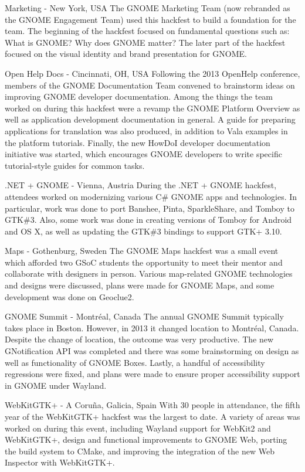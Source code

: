 \documentclass{scrreprt}
\begin{document}
Marketing - New York, USA
The GNOME Marketing Team (now rebranded as the GNOME Engagement Team) used this hackfest to build a foundation for the team.  The beginning of the hackfest focused on  fundamental questions such as: What is GNOME? Why does GNOME matter?  The later part of the hackfest focused on the visual identity and brand presentation for GNOME.

Open Help Docs - Cincinnati, OH, USA
Following the 2013 OpenHelp conference, members of the GNOME Documentation Team convened to brainstorm ideas on improving GNOME developer documentation. Among the things the team worked on during this hackfest were a revamp the GNOME Platform Overview as well as application development documentation in general. A guide for preparing applications for translation was also produced, in addition to Vala examples in the platform tutorials. Finally, the new HowDoI developer documentation initiative was started, which encourages GNOME developers to write specific tutorial-style guides for common tasks.

.NET + GNOME - Vienna, Austria
During the .NET + GNOME hackfest, attendees worked on modernizing various C\# GNOME apps and technologies. In particular, work was done to port Banshee, Pinta, SparkleShare, and Tomboy to GTK\#3. Also, some work was done in creating versions of Tomboy for Android and OS X, as well as updating the GTK\#3 bindings to support GTK+ 3.10.

Maps - Gothenburg, Sweden
The GNOME Maps hackfest was a small event which afforded two GSoC students the opportunity to meet their mentor and collaborate with designers in person. Various map-related GNOME technologies and designs were discussed, plans were made for GNOME Maps, and some development was done on Geoclue2.

GNOME Summit - Montréal, Canada
The annual GNOME Summit typically takes place in Boston. However, in 2013 it changed location to Montréal, Canada. Despite the change of location, the outcome was very productive. The new GNotification API was completed and there was some brainstorming on design as well as functionality of GNOME Boxes. Lastly, a handful of accessibility regressions were fixed, and plans were made to ensure proper accessibility support in GNOME under Wayland.

WebKitGTK+ - A Coruña, Galicia, Spain
With 30 people in attendance, the fifth year of the WebKitGTK+ hackfest was the largest to date. A variety of areas was worked on during this event, including Wayland support for WebKit2 and WebKitGTK+, design and functional improvements to GNOME Web, porting the build system to CMake, and improving the integration of the new Web Inspector with WebKitGTK+.
\end{document}

